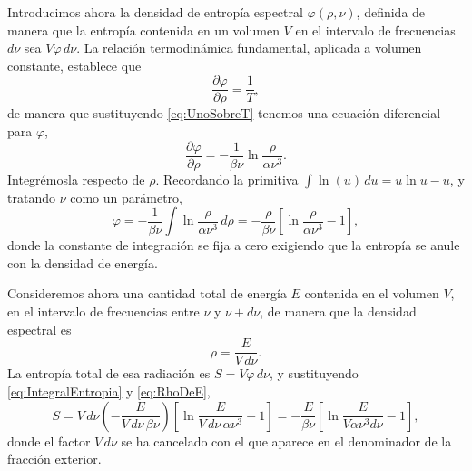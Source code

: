             Introducimos ahora la densidad de entropía espectral $\varphi(\rho,\nu)$, definida de manera que la entropía contenida en un volumen $V$ en el intervalo de frecuencias $d\nu$ sea $V\varphi\,d\nu$. La relación termodinámica fundamental, aplicada a volumen constante, establece que
            \begin{equation}\label{eq:RelacionTermo}
                \frac{\partial\varphi}{\partial\rho} = \frac{1}{T},
            \end{equation}
            de manera que sustituyendo \eqref{eq:UnoSobreT} tenemos una ecuación diferencial para $\varphi$,
            \begin{equation}\label{eq:EDOEntropia}
                \frac{\partial\varphi}{\partial\rho} = -\frac{1}{\beta\nu}\ln\frac{\rho}{\alpha\nu^{3}} .
            \end{equation}
            Integrémosla respecto de $\rho$. Recordando la primitiva $\int\ln(u)\,du = u\ln u - u$, y tratando $\nu$ como un parámetro,
            \begin{equation}\label{eq:IntegralEntropia}
                \varphi = -\frac{1}{\beta\nu}\int\ln\frac{\rho}{\alpha\nu^{3}}\,d\rho
                = -\frac{\rho}{\beta\nu}\left[\ln\frac{\rho}{\alpha\nu^{3}} - 1\right],
            \end{equation}
            donde la constante de integración se fija a cero exigiendo que la entropía se anule con la densidad de energía.

            Consideremos ahora una cantidad total de energía $E$ contenida en el volumen $V$, en el intervalo de frecuencias entre $\nu$ y $\nu + d\nu$, de manera que la densidad espectral es
            \begin{equation}\label{eq:RhoDeE}
                \rho = \frac{E}{V\,d\nu} .
            \end{equation}
            La entropía total de esa radiación es $S = V\varphi\,d\nu$, y sustituyendo \eqref{eq:IntegralEntropia} y \eqref{eq:RhoDeE},
            \begin{equation}\label{eq:EntropiaTotal}
                S = V\,d\nu\left(-\frac{E}{V\,d\nu\,\beta\nu}\right)\left[\ln\frac{E}{V\,d\nu\,\alpha\nu^{3}} - 1\right]
                = -\frac{E}{\beta\nu}\left[\ln\frac{E}{V\alpha\nu^{3}d\nu} - 1\right],
            \end{equation}
            donde el factor $V\,d\nu$ se ha cancelado con el que aparece en el denominador de la fracción exterior.

